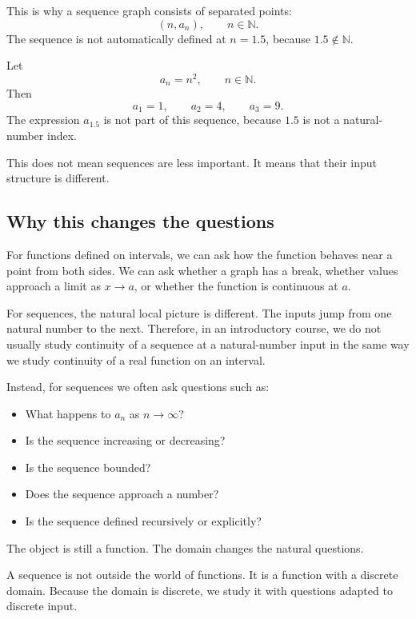This is why a sequence graph consists of separated points:
\[
(n,a_n),
\qquad n\in\mathbb{N}.
\]
The sequence is not automatically defined at \(n=1.5\), because \(1.5\notin\mathbb{N}\).

\begin{examplebox}
Let
\[
a_n=n^2,
\qquad n\in\mathbb{N}.
\]
Then
\[
a_1=1,
\qquad
a_2=4,
\qquad
a_3=9.
\]
The expression \(a_{1.5}\) is not part of this sequence, because \(1.5\) is not a natural-number index.
\end{examplebox}

This does not mean sequences are less important. It means that their input structure is different.

\subsection*{Why this changes the questions}

For functions defined on intervals, we can ask how the function behaves near a point from both sides. We can ask whether a graph has a break, whether values approach a limit as \(x\to a\), or whether the function is continuous at \(a\).

For sequences, the natural local picture is different. The inputs jump from one natural number to the next. Therefore, in an introductory course, we do not usually study continuity of a sequence at a natural-number input in the same way we study continuity of a real function on an interval.

Instead, for sequences we often ask questions such as:
\begin{itemize}
\item What happens to \(a_n\) as \(n\to\infty\)?
\item Is the sequence increasing or decreasing?
\item Is the sequence bounded?
\item Does the sequence approach a number?
\item Is the sequence defined recursively or explicitly?
\end{itemize}

The object is still a function. The domain changes the natural questions.

\begin{remarkbox}
A sequence is not outside the world of functions. It is a function with a discrete domain. Because the domain is discrete, we study it with questions adapted to discrete input.
\end{remarkbox}


